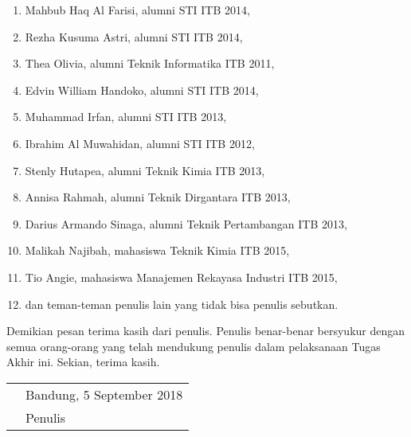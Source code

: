 \begin{enumerate}
    \item Mahbub Haq Al Farisi, alumni STI ITB 2014,
    \item Rezha Kusuma Astri, alumni STI ITB 2014,
    \item Thea Olivia, alumni Teknik Informatika ITB 2011,
    \item Edvin William Handoko, alumni STI ITB 2014,
    \item Muhammad Irfan, alumni STI ITB 2013,
    \item Ibrahim Al Muwahidan, alumni STI ITB 2012,
    \item Stenly Hutapea, alumni Teknik Kimia ITB 2013,
    \item Annisa Rahmah, alumni Teknik Dirgantara ITB 2013,
    \item Darius Armando Sinaga, alumni Teknik Pertambangan ITB 2013,
    \item Malikah Najibah, mahasiswa Teknik Kimia ITB 2015,
    \item Tio Angie, mahasiswa Manajemen Rekayasa Industri ITB 2015,
    \item dan teman-teman penulis lain yang tidak bisa penulis sebutkan.
\end{enumerate}

Demikian pesan terima kasih dari penulis. Penulis benar-benar bersyukur dengan semua orang-orang yang telah mendukung penulis dalam pelaksanaan Tugas Akhir ini. Sekian, terima kasih.

\vspace{15mm}
\begin{tabularx}{\textwidth}{l@{\hskip 0.5\textwidth}l}
    & Bandung, 5 September 2018\\
    & Penulis
\end{tabularx}